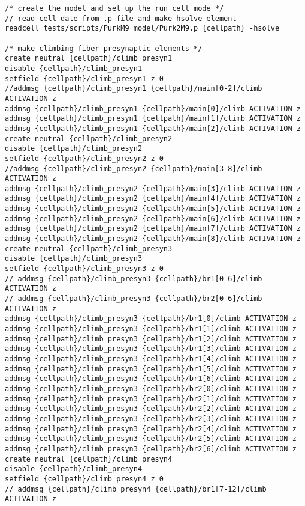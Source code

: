 \documentclass[10pt]{article}
\begin{document}
\begin{verbatim}
/* create the model and set up the run cell mode */
// read cell date from .p file and make hsolve element
readcell tests/scripts/PurkM9_model/Purk2M9.p {cellpath} -hsolve

/* make climbing fiber presynaptic elements */
create neutral {cellpath}/climb_presyn1
disable {cellpath}/climb_presyn1
setfield {cellpath}/climb_presyn1 z 0
//addmsg {cellpath}/climb_presyn1 {cellpath}/main[0-2]/climb ACTIVATION z
addmsg {cellpath}/climb_presyn1 {cellpath}/main[0]/climb ACTIVATION z
addmsg {cellpath}/climb_presyn1 {cellpath}/main[1]/climb ACTIVATION z
addmsg {cellpath}/climb_presyn1 {cellpath}/main[2]/climb ACTIVATION z
create neutral {cellpath}/climb_presyn2
disable {cellpath}/climb_presyn2
setfield {cellpath}/climb_presyn2 z 0
//addmsg {cellpath}/climb_presyn2 {cellpath}/main[3-8]/climb ACTIVATION z
addmsg {cellpath}/climb_presyn2 {cellpath}/main[3]/climb ACTIVATION z
addmsg {cellpath}/climb_presyn2 {cellpath}/main[4]/climb ACTIVATION z
addmsg {cellpath}/climb_presyn2 {cellpath}/main[5]/climb ACTIVATION z
addmsg {cellpath}/climb_presyn2 {cellpath}/main[6]/climb ACTIVATION z
addmsg {cellpath}/climb_presyn2 {cellpath}/main[7]/climb ACTIVATION z
addmsg {cellpath}/climb_presyn2 {cellpath}/main[8]/climb ACTIVATION z
create neutral {cellpath}/climb_presyn3
disable {cellpath}/climb_presyn3
setfield {cellpath}/climb_presyn3 z 0
// addmsg {cellpath}/climb_presyn3 {cellpath}/br1[0-6]/climb ACTIVATION z
// addmsg {cellpath}/climb_presyn3 {cellpath}/br2[0-6]/climb ACTIVATION z
addmsg {cellpath}/climb_presyn3 {cellpath}/br1[0]/climb ACTIVATION z
addmsg {cellpath}/climb_presyn3 {cellpath}/br1[1]/climb ACTIVATION z
addmsg {cellpath}/climb_presyn3 {cellpath}/br1[2]/climb ACTIVATION z
addmsg {cellpath}/climb_presyn3 {cellpath}/br1[3]/climb ACTIVATION z
addmsg {cellpath}/climb_presyn3 {cellpath}/br1[4]/climb ACTIVATION z
addmsg {cellpath}/climb_presyn3 {cellpath}/br1[5]/climb ACTIVATION z
addmsg {cellpath}/climb_presyn3 {cellpath}/br1[6]/climb ACTIVATION z
addmsg {cellpath}/climb_presyn3 {cellpath}/br2[0]/climb ACTIVATION z
addmsg {cellpath}/climb_presyn3 {cellpath}/br2[1]/climb ACTIVATION z
addmsg {cellpath}/climb_presyn3 {cellpath}/br2[2]/climb ACTIVATION z
addmsg {cellpath}/climb_presyn3 {cellpath}/br2[3]/climb ACTIVATION z
addmsg {cellpath}/climb_presyn3 {cellpath}/br2[4]/climb ACTIVATION z
addmsg {cellpath}/climb_presyn3 {cellpath}/br2[5]/climb ACTIVATION z
addmsg {cellpath}/climb_presyn3 {cellpath}/br2[6]/climb ACTIVATION z
create neutral {cellpath}/climb_presyn4
disable {cellpath}/climb_presyn4
setfield {cellpath}/climb_presyn4 z 0
// addmsg {cellpath}/climb_presyn4 {cellpath}/br1[7-12]/climb ACTIVATION z

\end{verbatim}
\end{document}
